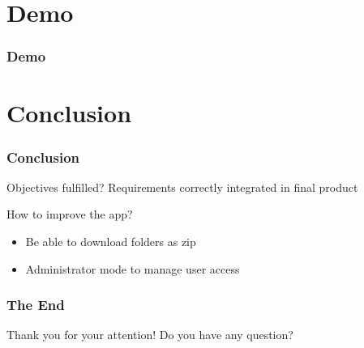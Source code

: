 \documentclass{beamer}
\begin{document}
	\section{Demo}
	\begin{frame}
		\frametitle{Demo}
	\end{frame}
	
	\section{Conclusion}
	\begin{frame}
		\frametitle{Conclusion}
		
		\begin{alertblock}{Objectives fulfilled?}
			Requirements correctly integrated in final product
		\end{alertblock}
		
		\begin{alertblock}{How to improve the app?}
			\begin{itemize}
				\item Be able to download folders as zip
				\item Administrator mode to manage user access
			\end{itemize}
		\end{alertblock}
	\end{frame}
	
	\begin{frame}
		\frametitle{The End}
		
		\centering
		Thank you for your attention!
		\linebreak
		Do you have any question?
	\end{frame}
\end{document}
